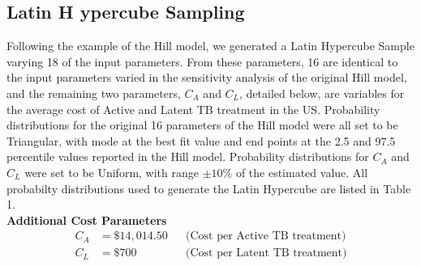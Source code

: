 \documentclass{amsart}
\begin{document}
\subsection{Latin H ypercube Sampling}
\label{subsec:lhs}
Following the example of the
Hill model, we generated a Latin Hypercube Sample varying 18 of the input
parameters.  From these parameters, 16 are identical to the input parameters
varied in the sensitivity analysis of the original Hill model, and the remaining
two parameters, $C_{A}$ and $C_{L}$, detailed below, are variables for the average cost of
Active and Latent TB treatment in the US.   Probability distributions for the
original 16 parameters of the Hill model were all set to be Triangular, with
mode at the best fit value and end points at the 2.5 and 97.5 percentile values
reported in the Hill model.  Probability distributions for $C_{A}$ and $C_{L}$
were set to be Uniform, with range $\pm10\%$ of the estimated value.  All
probabilty distributions used to generate the Latin Hypercube are listed in
Table 1.\\

{\bf Additional Cost Parameters}
\begin{align*}
  C_{A} &= \$14,014.50 &&\text{(Cost per Active TB treatment)}\\
  C_{L} &= \$700       &&\text{(Cost per Latent TB treatment)}
\end{align*}
\vspace{5mm}
\end{document}
